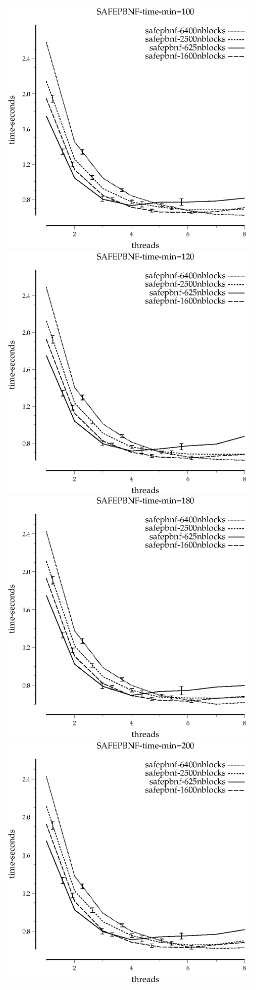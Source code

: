 \documentclass{article}
\begin{document}
\begin{figure}
\begin{center}
\includegraphics[width=2.5in]{SAFEPBNF-time-min=100}
\includegraphics[width=2.5in]{SAFEPBNF-time-min=120}
\includegraphics[width=2.5in]{SAFEPBNF-time-min=180}
\includegraphics[width=2.5in]{SAFEPBNF-time-min=200}

\end{center}
\end{figure}
\end{document}
